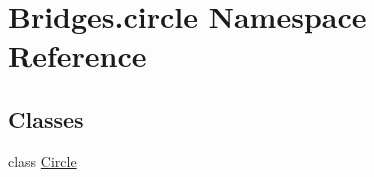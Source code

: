 \hypertarget{namespace_bridges_1_1circle}{}\section{Bridges.\+circle Namespace Reference}
\label{namespace_bridges_1_1circle}
\subsection*{Classes}
\begin{DoxyCompactItemize}
\item 
class \mbox{\hyperlink{class_bridges_1_1circle_1_1_circle}{Circle}}
\end{DoxyCompactItemize}
